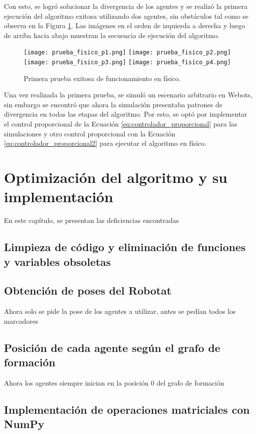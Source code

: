 Con esto, se logró solucionar la divergencia de los agentes y se realizó la primera ejecución del algoritmo exitosa utilizando dos agentes, sin obstáculos tal como se observa en la Figura \ref{fig:prueba_fisico1}. Las imágenes en el orden de izquierda a derecha y luego de arriba hacia abajo muestran la secuencia de ejecución del algoritmo.

\begin{figure}[H]
	\centering
	\texttt{[image: prueba\_fisico\_p1.png]}
	\texttt{[image: prueba\_fisico\_p2.png]}
	\texttt{[image: prueba\_fisico\_p3.png]}
	\texttt{[image: prueba\_fisico\_p4.png]}
	\caption{Primera prueba exitosa de funcionamiento en físico.}
	\label{fig:prueba_fisico1}
\end{figure}

Una vez realizada la primera prueba, se simuló un escenario arbitrario en Webots, sin embargo se encontró que ahora la simulación presentaba patrones de divergencia en todas las etapas del algoritmo. Por esto, se optó por implementar el control proporcional de la Ecuación \ref{eq:controlador_proporcional} para las simulaciones y otro control proporcional con la Ecuación \ref{eq:controlador_proporcional2} para ejecutar el algoritmo en físico.

\chapter{Optimización del algoritmo y su implementación}
En este capítulo, se presentan las deficiencias encontradas 

\section{Limpieza de código y eliminación de funciones y variables obsoletas}
\section{Obtención de poses del Robotat}
	Ahora solo se pide la pose de los agentes a utilizar, antes se pedían todos los marcadores
\section{Posición de cada agente según el grafo de formación}
	Ahora los agentes siempre inician en la posición 0 del grafo de formación
\section{Implementación de operaciones matriciales con NumPy}
